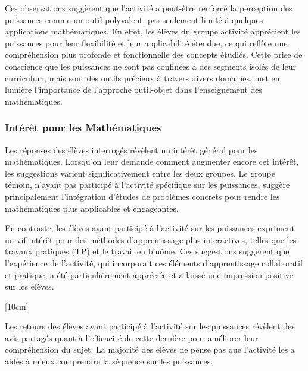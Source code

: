 \vspace*{0.5cm}

Ces observations suggèrent que l'activité a peut-être renforcé la perception des puissances comme un outil polyvalent,
pas seulement limité à quelques applications mathématiques.
En effet,
les élèves du groupe activité apprécient les puissances pour leur flexibilité et leur applicabilité étendue,
ce qui reflète une compréhension plus profonde et fonctionnelle des concepts étudiés.
Cette prise de conscience que les puissances ne sont pas confinées à des segments isolés de leur curriculum,
mais sont des outils précieux à travers divers domaines,
met en lumière l'importance de l'approche outil-objet dans l'enseignement des mathématiques.

\subsubsection{Intérêt pour les Mathématiques}

Les réponses des élèves interrogés révèlent un intérêt général pour les mathématiques.
Lorsqu'on leur demande comment augmenter encore cet intérêt,
les suggestions varient significativement entre les deux groupes.
Le groupe témoin,
n'ayant pas participé à l'activité spécifique sur les puissances,
suggère principalement l'intégration d'études de problèmes concrets pour rendre les mathématiques plus applicables et engageantes.

\vspace*{0.5cm}

En contraste,
les élèves ayant participé à l'activité sur les puissances expriment un vif intérêt pour des méthodes d'apprentissage plus interactives,
telles que les travaux pratiques (TP) et le travail en binôme.
Ces suggestions suggèrent que l'expérience de l'activité,
qui incorporait ces éléments d'apprentissage collaboratif et pratique,
a été particulièrement appréciée et a laissé une impression positive sur les élèves.


[10cm]

Les retours des élèves ayant participé à l'activité sur les puissances révèlent des avis partagés quant à l'efficacité de cette dernière pour améliorer leur compréhension du sujet.
La majorité des élèves ne pense pas que l'activité les a aidés à mieux comprendre la séquence sur les puissances.


